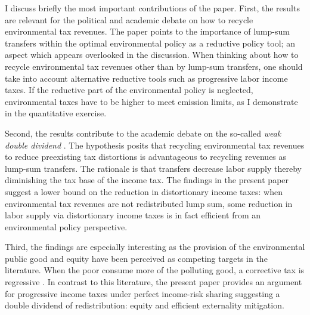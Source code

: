 I discuss briefly the most important contributions of the paper.
First, the results are relevant for the political and academic debate on how  to recycle environmental tax revenues. The paper points to the importance of lump-sum transfers within the optimal environmental policy as a reductive policy tool; an aspect which appears overlooked in the discussion.%
When thinking about how to recycle environmental tax revenues other than by lump-sum transfers,  one should take into account alternative reductive tools such as progressive labor income taxes. 
If the reductive part of the environmental policy is neglected, environmental taxes have to be higher to meet emission limits, as I demonstrate in the quantitative exercise.

Second, the results contribute to the academic debate on the so-called \textit{weak double dividend} \citep[for example:][]{LansBovenberg1994EnvironmentalTaxation, LansBovenberg1996OptimalAnalyses}. The hypothesis posits that recycling environmental tax revenues to reduce preexisting tax distortions is advantageous to recycling  revenues as lump-sum transfers. The rationale is that transfers decrease labor supply thereby diminishing the tax base of the income tax. %
The findings in the present paper suggest a lower bound on the reduction in distortionary income taxes: when environmental tax revenues are not redistributed lump sum, some reduction in labor supply via distortionary income taxes is in fact efficient from an environmental policy perspective. %

Third, the findings are especially interesting as the provision of the environmental public good and equity have been perceived as competing targets in the literature. When the poor consume more of the polluting good, a corrective tax is regressive \citep{ Fried2018TheGenerations, Sager2019IncomeCurves}. %
In contrast to this literature, the present paper provides an argument for progressive income taxes under perfect income-risk sharing suggesting a double dividend of redistribution: equity and efficient externality mitigation. %
